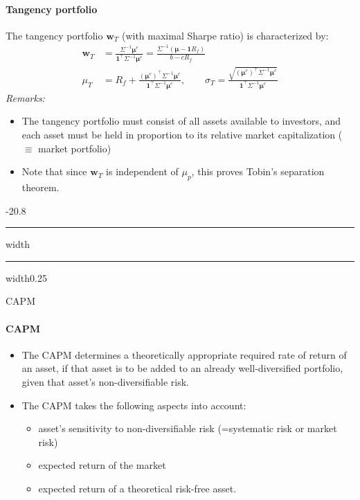 \documentclass[a4paper,landscape,8pt,fleqn]{scrartcl}
\makeatletter
\renewcommand{\subsection}{\@startsection{subsection}{1}{0mm}%
{-2\baselineskip}{0.8\baselineskip}%
{\hrule depth 0.2pt width\columnwidth\hrule depth0.75pt
width0.25\columnwidth\vspace*{1.2em}\large\bfseries}}
\makeatother
\begin{document}
\begin{multicols*}{3}
\paragraph{Tangency portfolio}
The tangency portfolio $\bm w_T$ (with maximal Sharpe ratio) is characterized by:
\begin{align*}
\bm w_T &= \frac{\Sigma^{-1} \bm \mu^e}{\bm 1^\top \Sigma^{-1} \bm \mu^e} = \frac{\Sigma^{-1} (\bm \mu - \bm 1 R_f)}{b - c R_f} \\
\mu_T &= R_f + \frac{(\bm \mu^e)^\top \Sigma^{-1} \bm \mu^e}{\bm 1^\top \Sigma^{-1} \bm \mu^e}, \qquad
\sigma_T = \frac{\sqrt{(\bm \mu^e)^\top \Sigma^{-1} \bm \mu^e}}{\bm 1^\top \Sigma^{-1} \bm \mu^e}
\end{align*}
\textit{Remarks:}
\begin{itemize}
\item The tangency portfolio must consist of all assets available to investors, and each asset must be held in proportion to its relative market capitalization ($\equiv$ market portfolio)
\item Note that since $\bm w_T$ is independent of $\mu_p$, this proves Tobin's separation theorem.
\end{itemize}


\subsection{CAPM}

\paragraph{CAPM}
\begin{itemize}
\item The CAPM determines a theoretically appropriate required rate of return of an asset, if that asset is to be added to an already well-diversified portfolio, given that asset's non-diversifiable risk.
\item The CAPM takes the following aspects into account:
\begin{itemize}
\item asset's sensitivity to non-diversifiable risk (=systematic risk or market risk)
\item expected return of the market
\item expected return of a theoretical risk-free asset.
\end{itemize}
\end{itemize}


\end{multicols*}
\end{document}
